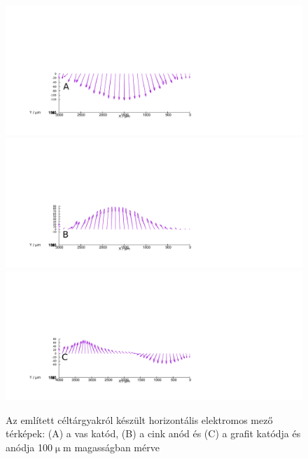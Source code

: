 \begin{figure}
\centering
\includegraphics[width=1.2\textwidth]{img/mérések/Fe_h100.pdf}
\includegraphics[width=1.2\textwidth]{img/mérések/Zn_h100.pdf}
\includegraphics[width=1.2\textwidth]{img/mérések/grafit_h100.pdf}

\caption{Az említett céltárgyakról készült horizontális elektromos mező térképek:
(A) a vas katód, (B) a cink anód és (C) a grafit katódja és anódja 100$\upmu$m magasságban mérve}
\label{fig:field_h}
\end{figure}

